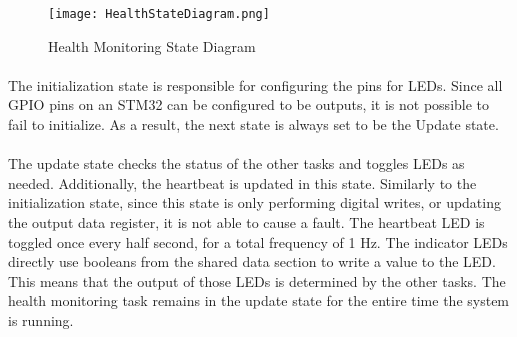\begin{figure}[H]
	\centering
	\texttt{[image: HealthStateDiagram.png]}
	\caption{Health Monitoring State Diagram}
	\label{fig:HealthDiagram}
\end{figure}

\paragraph{}
The initialization state is responsible for configuring the pins for LEDs.
Since all GPIO pins on an STM32 can be configured to be outputs, it is not possible to fail to initialize.
As a result, the next state is always set to be the Update state.

\paragraph{}
The update state checks the status of the other tasks and toggles LEDs as needed.
Additionally, the heartbeat is updated in this state.
Similarly to the initialization state, since this state is only performing digital writes, or updating the output data register, it is not able to cause a fault.
The heartbeat LED is toggled once every half second, for a total frequency of 1 Hz.
The indicator LEDs directly use booleans from the shared data section to write a value to the LED.
This means that the output of those LEDs is determined by the other tasks.
The health monitoring task remains in the update state for the entire time the system is running.